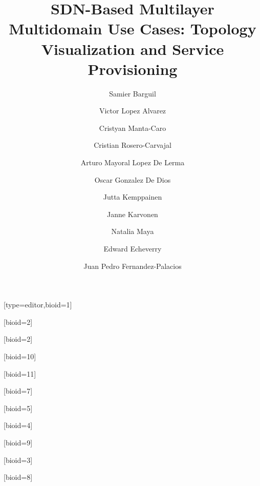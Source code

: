 \documentclass[a4paper,fleqn]{cas-dc}
\begin{document}
\let\WriteBookmarks\relax
\def\floatpagepagefraction{1}
\def\textpagefraction{.001}

\title [mode = title]{SDN-Based Multilayer Multidomain Use Cases: Topology Visualization and Service Provisioning}                      



\author[1,4]{Samier Barguil}[type=editor,bioid=1]
\cormark[1]

\author[2]{Victor Lopez Alvarez}[bioid=2]

\author[4]{Cristyan Manta-Caro}[bioid=2]

\author[4]{Cristian Rosero-Carvajal}[bioid=10]

\author[2]{Arturo Mayoral Lopez De Lerma}[bioid=11]

\author[2]{Oscar Gonzalez De Dios}[bioid=7]

\author[5]{Jutta Kemppainen}[bioid=5]

\author[5]{Janne Karvonen}[bioid=4]

\author[5]{Natalia Maya}[bioid=9]

\author[3]{Edward Echeverry}[bioid=3]

\author[2]{Juan Pedro Fernandez-Palacios}[bioid=8]

\address[1]{Universidad Autonoma de Madrid, Madrid, Spain}
\address[2]{Telefonica I+D, Ronda de la Comunicacion, Madrid, Spain}
\address[3]{Telefonica Movistar, Transversal 60 No 114ª -55. Bogotá, Colombia}
\address[4]{Wipro Technologies Ltd., Doddakannelli, Sarjapur Road
Bengaluru - 560 035, India}
\address[5]{Infinera Corporation, 140 Caspian Court, Sunnyvale, CA 94089, USA}
\end{document}
